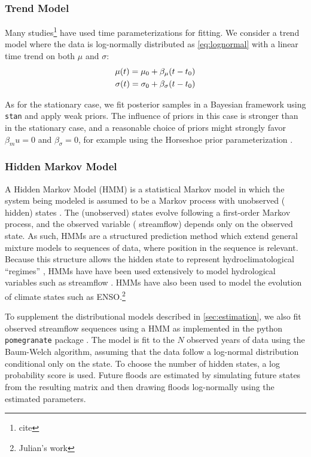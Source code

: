 \documentclass[11pt]{article}
\begin{document}
\subsubsection{Trend Model\label{sec:method-trend}}

Many studies\footnote{cite} have used time parameterizations for fitting.
We consider a trend model where the data is log-normally distributed as \cref{eq:lognormal} with a linear time trend on both \( \mu \) and \( \sigma \):
\begin{align}
  \mu(t) = \mu_0 + \beta_\mu \qty(t - t_0) \\
  \sigma(t) = \sigma_0 + \beta_\sigma \qty(t - t_0)
\end{align}

As for the stationary case, we fit posterior samples in a Bayesian framework using \texttt{stan} and apply weak priors.
The influence of priors in this case is stronger than in the stationary case, and a reasonable choice of priors might strongly favor \(\beta_mu=0\) and \(\beta_\sigma=0\), for example using the Horseshoe prior parameterization \citep{Piironen2016a}.

\subsubsection{Hidden Markov Model\label{sec:method-HMM}}

A Hidden Markov Model (HMM) is a statistical Markov model in which the system being modeled is assumed to be a Markov process with unobserved (\ie{} hidden) states \citep{Rabiner1986}.
The (unobserved) states evolve following a first-order Markov process, and the observed variable (\ie{} streamflow) depends only on the observed state.
As such, HMMs are a structured prediction method which extend general mixture models to sequences of data, where position in the sequence is relevant.
Because this structure allows the hidden state to represent hydroclimatological ``regimes'' \citep{Reinhold1982,Michelangeli1995,Merz2014}, HMMs have have been used extensively to model hydrological variables such as streamflow \citep{Bracken2016}.
HMMs have also been used to model the evolution of climate states such as ENSO.\footnote{Julian's work}

To supplement the distributional models described in \cref{sec:estimation}, we also fit observed streamflow sequences using a HMM as implemented in the python \texttt{pomegranate} package \citep{Schreiber2016}.
The model is fit to the \(N\) observed years of data using the Baum-Welch algorithm, assuming that the data follow a log-normal distribution conditional only on the state.
To choose the number of hidden states, a log probability score is used.
Future floods are estimated by simulating future states from the resulting matrix and then drawing floods log-normally using the estimated parameters.
\end{document}
